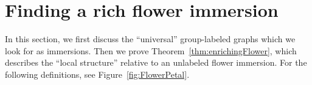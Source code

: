 \documentclass[11pt]{article}
\theoremstyle{definition}
\newcommand{\RMin}[1]{\todo[inline,bordercolor=white,color=DeepCarrotOrange,backgroundcolor=BananaYellow!40,textcolor=DeepCarrotOrange,size=\footnotesize]{\textsf{RM: #1}}}
\begin{document}

\section{Finding a rich flower immersion}
\label{sec:richFlower}

In this section, we first discuss the ``universal'' group-labeled graphs which we look for as immersions. Then we prove Theorem~\ref{thm:enrichingFlower}, which describes the ``local structure'' relative to an unlabeled flower immersion. For the following definitions, see Figure~\ref{fig:FlowerPetal}. 

\end{document}
